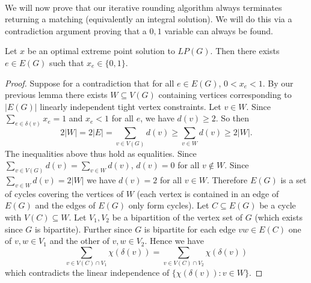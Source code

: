 \paragraph{} We will now prove that our iterative rounding algorithm always terminates returning a matching (equivalently an integral solution). We will do this via a contradiction argument proving that a $0,1$ variable can always be found.
\begin{lemma} Let $x$ be an optimal extreme point solution to $LP(G)$. Then there exists $e \in E(G)$ such that $x_e \in \{0,1\}$.
\end{lemma}
\begin{proof}
Suppose for a contradiction that for all $e\in E(G)$, $0 < x_e < 1$. By our previous lemma there exists $W \subseteq V(G)$ containing vertices corresponding to $|E(G)|$ linearly independent tight vertex constraints. Let $v \in W$. Since $\sum_{e\in \delta(v)} x_e = 1$ and $x_e < 1$ for all $e$, we have $d(v) \geq 2$. So then
$$2|W| = 2|E| = \sum_{v \in V(G)} d(v) \geq \sum_{v\in W} d(v) \geq 2|W|.$$
The inequalities above thus hold as equalities. Since $\sum_{v\in V(G)} d(v) = \sum_{v \in W} d(v)$, $d(v) = 0$ for all $v \not\in W$. Since $\sum_{v \in W} d(v) = 2|W|$ we have $d(v) = 2$ for all $v \in W$. Therefore $E(G)$ is a set of cycles covering the vertices of $W$ (each vertex is contained in an edge of $E(G)$ and the edges of $E(G)$ only form cycles). Let $C \subseteq E(G)$ be a cycle with $V(C) \subseteq W$. Let $V_1, V_2$ be a bipartition of the vertex set of $G$ (which exists since $G$ is bipartite). Further since $G$ is bipartite for each edge $vw \in E(C)$ one of $v,w \in V_1$ and the other of $v,w \in V_2$. Hence we have
$$\sum_{v \in V(C) \cap V_1} \chi(\delta(v)) = \sum_{v\in V(C) \cap V_2} \chi(\delta(v))$$
which contradicts the linear independence of $\{\chi(\delta(v)) : v \in W\}$.
\end{proof}
